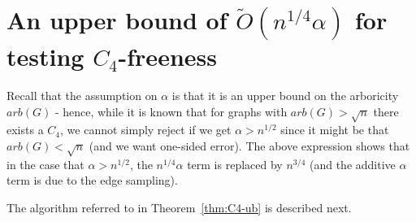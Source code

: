
\section{An upper bound of $\widetilde{O}(n^{1/4} \alpha)$ for testing $C_4$-freeness}\label{subsec:C4-ub}
\label{sec:C4}






Recall that the assumption on $\alpha$ is that it is an upper bound on the arboricity $arb(G)$ - hence, while it is known that for graphs with $arb(G)>\sqrt{n}$ there exists a $C_4$,  we cannot simply reject if we get $\alpha>n^{1/2}$ since it might be that $arb(G)<\sqrt{n}$ (and we want one-sided error). 
The above expression shows that in the  case that $\alpha>n^{1/2}$, the $n^{1/4}\alpha$ term is replaced by $n^{3/4}$ (and the additive $\alpha$ term is due to the edge sampling).


The algorithm referred to in Theorem~\ref{thm:C4-ub} is described next. 

